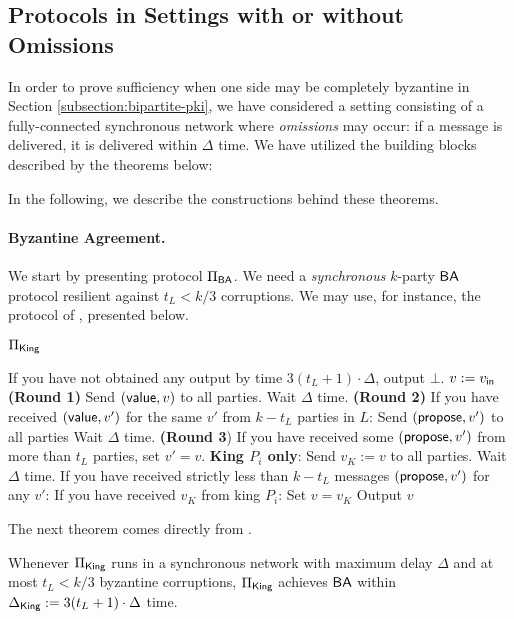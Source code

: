 \subsection{Protocols in Settings with or without Omissions} \label{appendix:sync-and-omission}
In order to prove sufficiency when one side may be completely byzantine in Section \ref{subsection:bipartite-pki}, we have considered a setting consisting of a fully-connected synchronous network where \emph{omissions} may occur: if a message is delivered, it is delivered within $\Delta$ time. We have utilized the building blocks described by the theorems below:
\BAWithOmissions*
\BBWithOmissions*

In the following, we describe the constructions behind these theorems.

\paragraph{Byzantine Agreement.} We start by presenting protocol $\Pi_{\textsf{BA}}$.
We need a \emph{synchronous} $k$-party $\textsf{BA}$ protocol resilient against $t_L < k / 3$ corruptions. We may use, for instance, the protocol of \cite{King}, presented below.
\begin{protocolbox}{$\Pi_{\textsf{King}}$}
    \begin{algorithmic}[1]
    \State If you have not obtained any output by time $3(t_L + 1) \cdot \Delta$, output $\bot$.
    \State $v := v_{\textsf{in}}$
    \State \textbf{(Round 1)}
    \State Send $(\textsf{value}, v)$ to all parties. 
    \State Wait $\Delta$ time.
    \State \textbf{(Round 2)}
    \State If you have received $(\textsf{value}, v')$ for the same $v'$ from $k - t_L$ parties in $L$:
    \State \hspace{0.5cm} Send $(\textsf{propose}, v')$ to all parties
    \State Wait $\Delta$ time.
    \State \textbf{(Round 3})
    \State If you have received some $(\textsf{propose}, v')$ from more than $t_L$ parties, set $v' = v$.
    \State \textbf{King $P_i$ only}: Send $v_K := v$ to all parties.
    \State Wait $\Delta$ time.
    \State If you have received strictly less than $k - t_L$ messages $(\textsf{propose}, v')$ for any $v'$:
    \State \hspace{0.5cm} If you have received $v_K$ from king $P_i$: Set $v = v_K$
    \EndFor
    \State Output $v$
\end{algorithmic}
\end{protocolbox}

The next theorem comes directly from \cite{King}.
\begin{theorem}
    Whenever $\Pi_{\textsf{King}}$ runs in a synchronous network with maximum delay $\Delta$ and at most $t_L < k / 3$ byzantine corruptions, $\Pi_{\textsf{King}}$ achieves $\textsf{BA}$ within $\Delta_{\textsf{King}} := 3(t_L + 1) \cdot \Delta$ time.
\end{theorem}

